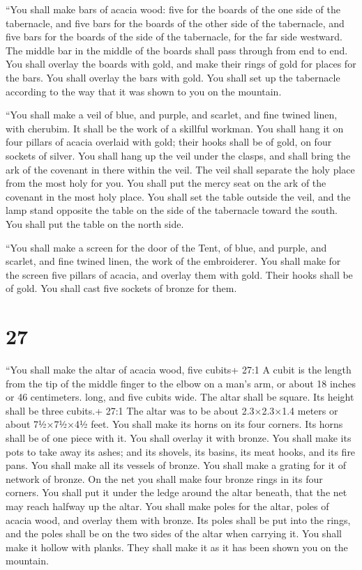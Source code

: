  ``You shall make bars of acacia wood: five for the boards
of the one side of the tabernacle,  and five bars for the
boards of the other side of the tabernacle, and five bars for the boards
of the side of the tabernacle, for the far side westward. 
The middle bar in the middle of the boards shall pass through from end
to end.  You shall overlay the boards with gold, and make
their rings of gold for places for the bars. You shall overlay the bars
with gold.  You shall set up the tabernacle according to
the way that it was shown to you on the mountain.

 ``You shall make a veil of blue, and purple, and scarlet,
and fine twined linen, with cherubim. It shall be the work of a skillful
workman.  You shall hang it on four pillars of acacia
overlaid with gold; their hooks shall be of gold, on four sockets of
silver.  You shall hang up the veil under the clasps, and
shall bring the ark of the covenant in there within the veil. The veil
shall separate the holy place from the most holy for you. 
You shall put the mercy seat on the ark of the covenant in the most holy
place.  You shall set the table outside the veil, and the
lamp stand opposite the table on the side of the tabernacle toward the
south. You shall put the table on the north side.

 ``You shall make a screen for the door of the Tent, of
blue, and purple, and scarlet, and fine twined linen, the work of the
embroiderer.  You shall make for the screen five pillars of
acacia, and overlay them with gold. Their hooks shall be of gold. You
shall cast five sockets of bronze for them.

\hypertarget{section-26}{%
\section{27}\label{section-26}}

 ``You shall make the altar of acacia wood, five cubits+
27:1 A cubit is the length from the tip of the middle finger to the
elbow on a man's arm, or about 18 inches or 46 centimeters. long, and
five cubits wide. The altar shall be square. Its height shall be three
cubits.+ 27:1 The altar was to be about 2.3×2.3×1.4 meters or about
7½×7½×4½ feet.  You shall make its horns on its four
corners. Its horns shall be of one piece with it. You shall overlay it
with bronze.  You shall make its pots to take away its
ashes; and its shovels, its basins, its meat hooks, and its fire pans.
You shall make all its vessels of bronze.  You shall make a
grating for it of network of bronze. On the net you shall make four
bronze rings in its four corners.  You shall put it under
the ledge around the altar beneath, that the net may reach halfway up
the altar.  You shall make poles for the altar, poles of
acacia wood, and overlay them with bronze.  Its poles shall
be put into the rings, and the poles shall be on the two sides of the
altar when carrying it.  You shall make it hollow with
planks. They shall make it as it has been shown you on the mountain.


